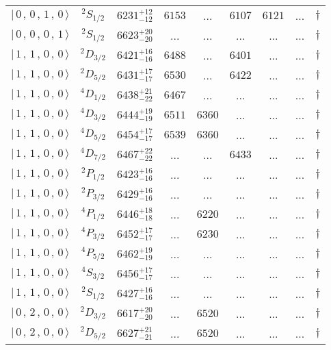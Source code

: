 \begin{tabular}{c c| c c c c c c c}
$\vert \,0\,,\,0\,,\,1\,,\,0 \,\rangle $ & $^{2}S_{1/2}$ & $6231^{+12}_{-12}$ & $6153$ & ... & $6107$ & $6121$ & ... & $\dagger$ \\ 
$\vert \,0\,,\,0\,,\,0\,,\,1 \,\rangle $ & $^{2}S_{1/2}$ & $6623^{+20}_{-20}$ & ... & ... & ... & ... & ... & $\dagger$ \\ 
$\vert \,1\,,\,1\,,\,0\,,\,0 \,\rangle $ & $^{2}D_{3/2}$ & $6421^{+16}_{-16}$ & $6488$ & ... & $6401$ & ... & ... & $\dagger$ \\ 
$\vert \,1\,,\,1\,,\,0\,,\,0 \,\rangle $ & $^{2}D_{5/2}$ & $6431^{+17}_{-17}$ & $6530$ & ... & $6422$ & ... & ... & $\dagger$ \\ 
$\vert \,1\,,\,1\,,\,0\,,\,0 \,\rangle $ & $^{4}D_{1/2}$ & $6438^{+21}_{-22}$ & $6467$ & ... & ... & ... & ... & $\dagger$ \\ 
$\vert \,1\,,\,1\,,\,0\,,\,0 \,\rangle $ & $^{4}D_{3/2}$ & $6444^{+19}_{-19}$ & $6511$ & $6360$ & ... & ... & ... & $\dagger$ \\ 
$\vert \,1\,,\,1\,,\,0\,,\,0 \,\rangle $ & $^{4}D_{5/2}$ & $6454^{+17}_{-17}$ & $6539$ & $6360$ & ... & ... & ... & $\dagger$ \\ 
$\vert \,1\,,\,1\,,\,0\,,\,0 \,\rangle $ & $^{4}D_{7/2}$ & $6467^{+22}_{-22}$ & ... & ... & $6433$ & ... & ... & $\dagger$ \\ 
$\vert \,1\,,\,1\,,\,0\,,\,0 \,\rangle $ & $^{2}P_{1/2}$ & $6423^{+16}_{-16}$ & ... & ... & ... & ... & ... & $\dagger$ \\ 
$\vert \,1\,,\,1\,,\,0\,,\,0 \,\rangle $ & $^{2}P_{3/2}$ & $6429^{+16}_{-16}$ & ... & ... & ... & ... & ... & $\dagger$ \\ 
$\vert \,1\,,\,1\,,\,0\,,\,0 \,\rangle $ & $^{4}P_{1/2}$ & $6446^{+18}_{-18}$ & ... & $6220$ & ... & ... & ... & $\dagger$ \\ 
$\vert \,1\,,\,1\,,\,0\,,\,0 \,\rangle $ & $^{4}P_{3/2}$ & $6452^{+17}_{-17}$ & ... & $6230$ & ... & ... & ... & $\dagger$ \\ 
$\vert \,1\,,\,1\,,\,0\,,\,0 \,\rangle $ & $^{4}P_{5/2}$ & $6462^{+19}_{-19}$ & ... & ... & ... & ... & ... & $\dagger$ \\ 
$\vert \,1\,,\,1\,,\,0\,,\,0 \,\rangle $ & $^{4}S_{3/2}$ & $6456^{+17}_{-17}$ & ... & ... & ... & ... & ... & $\dagger$ \\ 
$\vert \,1\,,\,1\,,\,0\,,\,0 \,\rangle $ & $^{2}S_{1/2}$ & $6427^{+16}_{-16}$ & ... & ... & ... & ... & ... & $\dagger$ \\ 
$\vert \,0\,,\,2\,,\,0\,,\,0 \,\rangle $ & $^{2}D_{3/2}$ & $6617^{+20}_{-20}$ & ... & $6520$ & ... & ... & ... & $\dagger$ \\ 
$\vert \,0\,,\,2\,,\,0\,,\,0 \,\rangle $ & $^{2}D_{5/2}$ & $6627^{+21}_{-21}$ & ... & $6520$ & ... & ... & ... & $\dagger$ \\ 
\hline \hline
\end{tabular}
